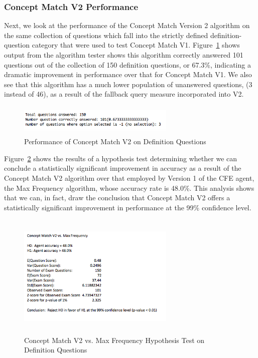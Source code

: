 \subsubsection{Concept Match V2 Performance}

Next, we look at the performance of the Concept Match Version 2 algorithm on the same collection of questions which fall into the strictly defined definition-question category that were used to test Concept Match V1.  Figure~\ref{fig:concept_match_v2_training_set_results_def} shows output from the algorithm tester shows this algorithm correctly answered 101 questions out of the collection of 150 definition questions, or 67.3\%, indicating a dramatic improvement in performance over that for Concept Match V1.  We also see that this algorithm has a much lower population of unanswered questions, (3 instead of 46), as a result of the fallback query measure incorporated into V2.



\begin{figure}
\centering
\vspace{1.0in}
\includegraphics[width=75mm, height=15mm]{concept_match_v2_training_set_results_def.png}
\caption{Performance of Concept Match V2 on Definition Questions}
\label{fig:concept_match_v2_training_set_results_def}
\end{figure}

Figure~\ref{fig:concept_match_v2_hypothesis_test} shows the results of a hypothesis test determining whether we can conclude a statistically significant improvement in accuracy as a result of the Concept Match V2 algorithm over that employed by Version 1 of the CFE agent, the Max Frequency algorithm, whose accuracy rate is 48.0\%.  This analysis shows that we can, in fact, draw the conclusion that Concept Match V2 offers a statistically significant improvement in performance at the 99\% confidence level.

\begin{figure}
\centering
\vspace{1.0in}
\includegraphics[width=75mm, height=60mm]{concept_match_v2_hypothesis_test.png}
\caption{Concept Match V2 vs. Max Frequency Hypothesis Test on Definition Questions}
\label{fig:concept_match_v2_hypothesis_test}
\end{figure}


